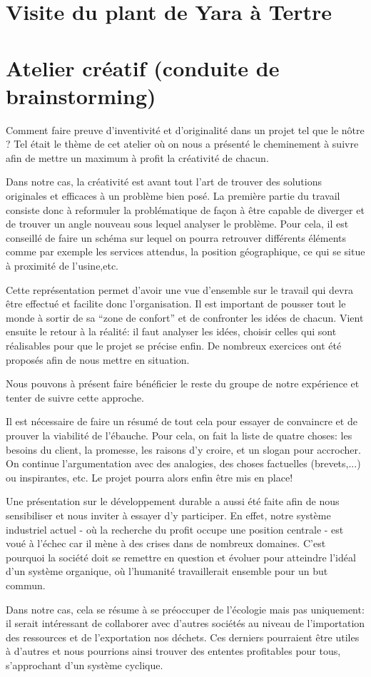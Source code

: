 \documentclass[a4paper, oneside, 12pt]{article}
\begin{document}
\section{Visite du plant de Yara à Tertre}

\section{Atelier créatif (conduite de brainstorming)}

Comment faire preuve d'inventivité et d'originalité dans un projet tel que le nôtre ? Tel était le thème de cet atelier où on nous a présenté le cheminement à suivre afin de mettre un maximum à profit la créativité de chacun.

Dans notre cas, la créativité est avant tout l'art de trouver des solutions originales et efficaces à un problème bien posé. La première partie du travail consiste donc à reformuler la problématique de façon à être capable de diverger et de trouver un angle nouveau sous lequel analyser le problème. Pour cela, il est conseillé de faire un schéma 
sur lequel on pourra retrouver différents éléments comme par exemple les services attendus, la position géographique, ce qui se situe à proximité de l’usine,etc.

Cette représentation permet d'avoir une vue d'ensemble sur le travail qui devra être effectué et facilite donc l'organisation. Il est important de pousser tout le monde à sortir de sa ``zone de confort'' et de confronter les idées de chacun. Vient ensuite le retour à la réalité: il faut analyser les idées, choisir celles qui sont réalisables pour que le projet se précise enfin. De nombreux exercices ont été proposés afin de nous mettre en situation. 

Nous pouvons à présent faire bénéficier le reste du groupe de notre expérience et tenter de suivre cette approche.

Il est nécessaire de faire un résumé de tout cela pour essayer de convaincre et de prouver la viabilité de l'ébauche. Pour cela, on fait la liste de quatre choses: les besoins du client, la promesse, les raisons d'y croire, et un slogan pour accrocher. On continue l'argumentation avec des analogies, des choses factuelles (brevets,...) ou inspirantes, etc. Le projet pourra alors enfin être mis en place!

Une présentation sur le développement durable a aussi été faite afin de nous sensibiliser et nous inviter à essayer d'y participer. En effet, notre système industriel actuel - où la recherche du profit occupe une position centrale - est voué à l'échec car il mène à des crises dans de nombreux domaines. C'est pourquoi la société doit se remettre en question et évoluer pour atteindre l'idéal d'un système organique, où l'humanité travaillerait ensemble pour un but commun. 

Dans notre cas, cela se résume à se préoccuper de l'écologie mais pas uniquement: il serait intéressant de collaborer avec d'autres sociétés au niveau de l'importation des ressources et de l'exportation nos déchets. Ces derniers pourraient être utiles à d'autres et nous pourrions ainsi trouver des ententes profitables pour tous, s'approchant d'un système cyclique.
\end{document}
